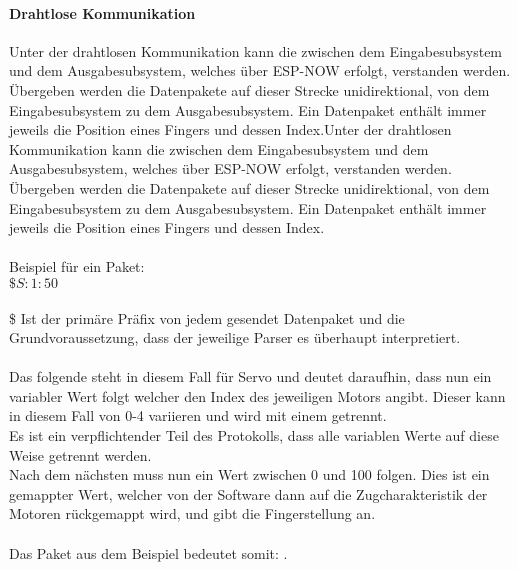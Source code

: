 \documentclass[titlepage,12pt,twoside]{article}
\begin{document}
\paragraph{Drahtlose Kommunikation}
\label{par:Drahtlose Kommunikation}
\hfill \break
\hfill \break
Unter der drahtlosen Kommunikation kann die zwischen dem Eingabesubsystem und dem Ausgabesubsystem, welches über ESP-NOW erfolgt, verstanden werden. 
Übergeben werden die Datenpakete auf dieser Strecke unidirektional, von dem Eingabesubsystem zu dem Ausgabesubsystem. Ein Datenpaket enthält immer jeweils 
die Position eines Fingers und dessen Index.Unter der drahtlosen Kommunikation kann die zwischen dem Eingabesubsystem und dem Ausgabesubsystem, welches 
über ESP-NOW erfolgt, verstanden werden. Übergeben werden die Datenpakete auf dieser Strecke unidirektional, von dem Eingabesubsystem zu dem 
Ausgabesubsystem. Ein Datenpaket enthält immer jeweils die Position eines Fingers und dessen Index. \\
\\
Beispiel für ein Paket: \\
$\$S:1:50$ \\
\\
\$ Ist der primäre Präfix von jedem gesendet Datenpaket und die Grundvoraussetzung, dass der jeweilige Parser es überhaupt interpretiert. \\
\\
Das folgende  steht in diesem Fall für Servo und deutet daraufhin, dass nun ein variabler Wert folgt welcher den Index des jeweiligen Motors angibt. 
Dieser kann in diesem Fall von 0-4 variieren und wird mit einem \textquote{:} getrennt. \\
Es ist ein verpflichtender Teil des Protokolls, dass alle variablen Werte auf diese Weise getrennt werden. \\
Nach dem nächsten \textquote{:} muss nun ein Wert zwischen 0 und 100 folgen. Dies ist ein gemappter Wert, welcher von der Software dann auf die Zugcharakteristik 
der Motoren rückgemappt wird, und gibt die Fingerstellung an. \\
\\
Das Paket aus dem Beispiel bedeutet somit: . \\
\\
\end{document}
